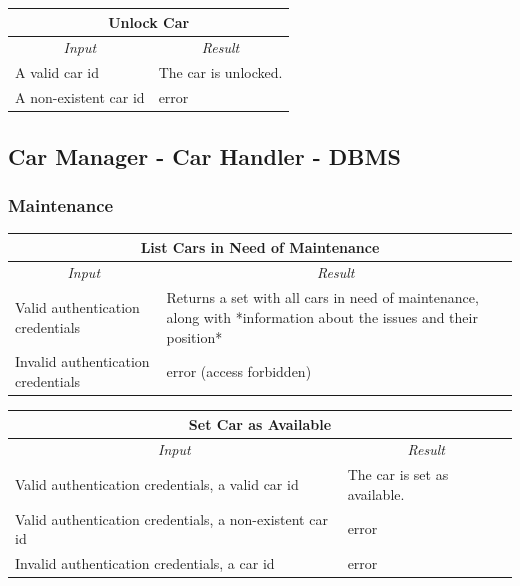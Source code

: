 \documentclass[english]{article}
\begin{document}
\begin{center}

	\begin{tabular}{ | p{6cm} | p{6cm} | }
		\hline 
		\multicolumn{2}{|c|}{\textbf{Unlock Car}} \\
		\hline
		\multicolumn{1}{|c|}{\textit{Input}} & \multicolumn{1}{c|}{\textit{Result}} \\
		\hline
		A valid car id & The car is unlocked. \\
		\hline
		A non-existent car id & error \\
		\hline
	\end{tabular}
\end{center}

\subsection{Car Manager - Car Handler - DBMS}


\subsubsection{Maintenance}
\begin{center}

	\begin{tabular}{ | p{6cm} | p{6cm} | }
		\hline 
		\multicolumn{2}{|c|}{\textbf{List Cars in Need of Maintenance}} \\
		\hline
		\multicolumn{1}{|c|}{\textit{Input}} & \multicolumn{1}{c|}{\textit{Result}} \\
		\hline
		Valid authentication credentials & Returns a set with all cars in need of maintenance, along with *information about the issues and their position* \\
		\hline
		Invalid authentication credentials & error (access forbidden) \\
		\hline
	\end{tabular}
\end{center}

\begin{center}

	\begin{tabular}{ | p{6cm} | p{6cm} | }
		\hline
		\multicolumn{2}{|c|}{\textbf{Set Car as Available}} \\
		\hline
		\multicolumn{1}{|c|}{\textit{Input}} & \multicolumn{1}{c|}{\textit{Result}} \\
		\hline
		Valid authentication credentials, a valid car id & The car is set as available. \\
		\hline
		Valid authentication credentials, a non-existent car id & error \\
		\hline
		Invalid authentication credentials, a car id & error \\
		\hline
	\end{tabular}
\end{center}
\end{document}
